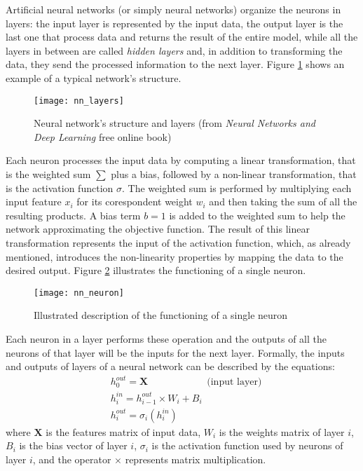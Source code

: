 Artificial neural networks (or simply neural networks) organize the neurons in layers: the input layer is represented by the input data, the output layer is the last one that process data and returns the result of the entire model, while all the layers in between are called \textit{hidden layers} and, in addition to transforming the data, they send the processed information to the next layer. Figure \ref{fig:nn_layers} shows an example of a typical network's structure.
\begin{figure}[htbp]
    \centering
    \texttt{[image: nn\_layers]}
    \caption{Neural network's structure and layers (from \textit{Neural Networks and Deep Learning} free online book)}
    \label{fig:nn_layers}
\end{figure}
Each neuron processes the input data by computing a linear transformation, that is the weighted sum $\sum$ plus a bias, followed by a non-linear transformation, that is the activation function $\sigma$. The weighted sum is performed by multiplying each input feature $x_i$ for its corespondent weight $w_i$ and then taking the sum of all the resulting products. A bias term $b = 1$ is added to the weighted sum to help the network approximating the objective function. The result of this linear transformation represents the input of the activation function, which, as already mentioned, introduces the non-linearity properties by mapping the data to the desired output. Figure \ref{fig:nn_neuron} illustrates the functioning of a single neuron. 
\begin{figure}[htbp]
    \centering
    \texttt{[image: nn\_neuron]}
    \caption{Illustrated description of the functioning of a single neuron}
    \label{fig:nn_neuron}
\end{figure}
Each neuron in a layer performs these operation and the outputs of all the neurons of that layer will be the inputs for the next layer. Formally, the inputs and outputs of layers of a neural network can be described by the equations:
\begin{align}
    &h^{\textit{out}}_{0} = \mathbf{X}\qquad\qquad\qquad \text{(input layer)}\\
    &h^{\textit{in}}_{i} = h^{\textit{out}}_{i-1} \times W_i + B_i\\
    &h^{\textit{out}}_{i} = \sigma_i (h^{\textit{in}}_{i})
\end{align}
where $\mathbf{X}$ is the features matrix of input data, $W_i$ is the weights matrix of layer $i$, $B_i$ is the bias vector of layer $i$, $\sigma_i$ is the activation function used by neurons of layer $i$, and the operator $\times$ represents matrix multiplication.

